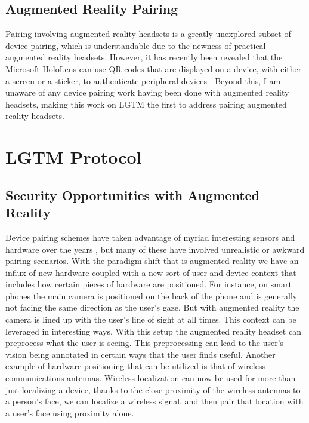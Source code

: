 \documentclass[12pt]{report}
\begin{document}
\section{Augmented Reality Pairing}
Pairing involving augmented reality headsets is a greatly unexplored subset of device pairing, which is understandable due to the newness of practical augmented reality headsets. However, it has recently been revealed that the Microsoft HoloLens can use QR codes that are displayed on a device, with either a screen or a sticker, to authenticate peripheral devices \cite{HoloLensVisualPairing2016}. Beyond this, I am unaware of any device pairing work having been done with augmented reality headsets, making this work on LGTM the first to address pairing augmented reality headsets. \par


\chapter{LGTM Protocol}
\section{Security Opportunities with Augmented Reality}
Device pairing schemes have taken advantage of myriad interesting sensors and hardware over the years \cite{PlayfulPairingGallego2011,BedaSoriente2007,ShakeWellBeforeUseMayrhofer2009,SeeingIsBelievingMcCune2005,TalkingToStrangersSmetters2002,LoudAndClearGoodrich2006,HapadepSoriente2008,VisualChannelPairingSaxena2006}, but many of these have involved unrealistic or awkward pairing scenarios. With the paradigm shift that is augmented reality we have an influx of new hardware coupled with a new sort of user and device context that includes how certain pieces of hardware are positioned. For instance, on smart phones the main camera is positioned on the back of the phone and is generally not facing the same direction as the user's gaze. But with augmented reality the camera is lined up with the user's line of sight at all times. This context can be leveraged in interesting ways. With this setup the augmented reality headset can preprocess what the user is seeing. This preprocessing can lead to the user's vision being annotated in certain ways that the user finds useful. Another example of hardware positioning that can be utilized is that of wireless communications antennas. Wireless localization can now be used for more than just localizing a device, thanks to the close proximity of the wireless antennas to a person's face, we can localize a wireless signal, and then pair that location with a user's face using proximity alone. 
\end{document}
